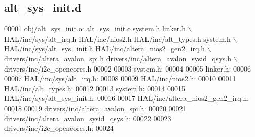 \subsection{alt\+\_\+sys\+\_\+init.\+d}
\label{alt__sys__init_8d_source}

\begin{DoxyCode}
00001 obj/alt_sys_init.o: alt_sys_init.c system.h linker.h \(\backslash\)
 HAL/inc/sys/alt_irq.h HAL/inc/nios2.h HAL/inc/alt\_types.h system.h \(\backslash\)
 HAL/inc/sys/alt_sys_init.h HAL/inc/altera\_nios2\_gen2\_irq.h \(\backslash\)
 drivers/inc/altera\_avalon\_spi.h drivers/inc/altera\_avalon\_sysid\_qsys.h \(\backslash\)
 drivers/inc/i2c\_opencores.h
00002 
00003 system.h:
00004 
00005 linker.h:
00006 
00007 HAL/inc/sys/alt_irq.h:
00008 
00009 HAL/inc/nios2.h:
00010 
00011 HAL/inc/alt\_types.h:
00012 
00013 system.h:
00014 
00015 HAL/inc/sys/alt_sys_init.h:
00016 
00017 HAL/inc/altera\_nios2\_gen2\_irq.h:
00018 
00019 drivers/inc/altera\_avalon\_spi.h:
00020 
00021 drivers/inc/altera\_avalon\_sysid\_qsys.h:
00022 
00023 drivers/inc/i2c\_opencores.h:
00024 \end{DoxyCode}
